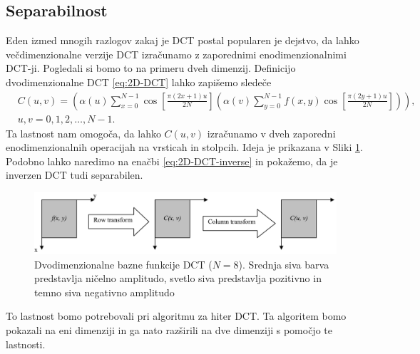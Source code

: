 \documentclass[a4paper,12pt,openright]{book}
\begin{document}
\subsection{Separabilnost} \label{Separabilnost}%
Eden izmed mnogih razlogov zakaj je DCT postal popularen je dejstvo, da lahko večdimenzionalne verzije DCT izračunamo z zaporednimi enodimenzionalnimi DCT-ji. Pogledali si bomo to na primeru dveh dimenzij. Definicijo dvodimenzionalne DCT \ref{eq:2D-DCT} lahko zapišemo sledeče
\begin{equation}
    \begin{aligned}
    &C(u,v) = \left(\alpha(u)  \sum_{x=0}^{N-1}\cos\left[\frac{\pi(2x+1)u}{2N}\right]
              \left(\alpha(v)  \sum_{y=0}^{N-1} f(x,y)\cos\left[\frac{\pi(2y+1)u}{2N}\right]\right)\right), \\
    &u,v = 0,1,2,\ldots,N-1.
    \end{aligned}
\label{eq:2D-DCT_Separabilnost}
\end{equation}
Ta lastnost nam omogoča, da lahko \(C(u,v)\) izračunamo v dveh zaporedni enodimenzionalnih operacijah na vrsticah in stolpcih. Ideja je prikazana v Sliki \ref{Prikaz_separabilnosti}. Podobno lahko naredimo na enačbi \ref{eq:2D-DCT-inverse} in pokažemo, da je inverzen DCT tudi separabilen.\par


\begin{figure}[ht] %
\begin{center}
\includegraphics[width=1\textwidth]{slike/Prikaz_Separabilnosti.pdf}
\end{center}
\caption{Dvodimenzionalne bazne funkcije DCT (\(N=8\)). Srednja siva barva predstavlja ničelno amplitudo, svetlo siva predstavlja pozitivno in temno siva negativno amplitudo}
\label{Prikaz_separabilnosti}
\end{figure}

To lastnost bomo potrebovali pri algoritmu za hiter DCT. Ta algoritem bomo pokazali na eni dimenziji in ga nato razširili na dve dimenziji s pomočjo te lastnosti.
\end{document}
